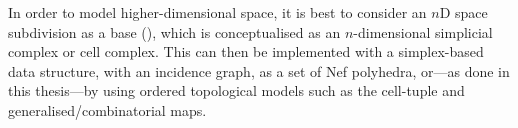 In order to model higher-dimensional space, it is best to consider an $n$D space subdivision as a base (), which is conceptualised as an $n$-dimensional simplicial complex or cell complex.
This can then be implemented with a simplex-based data structure, with an incidence graph, as a set of Nef polyhedra, or---as done in this thesis---by using ordered topological models such as the cell-tuple and generalised/combinatorial maps.

